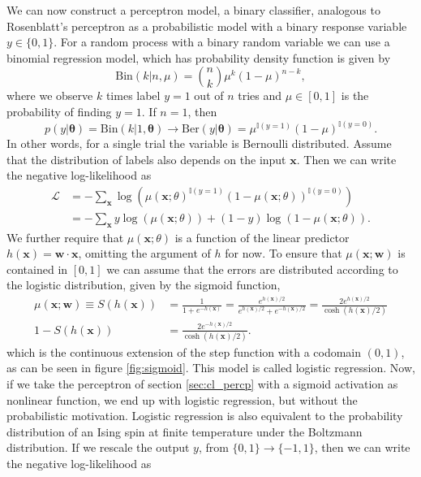 \noindent We can now construct a perceptron model, a binary classifier, analogous to Rosenblatt's perceptron as a probabilistic model with a binary response variable $y\in \{0,1\}$. For a random process with a binary random variable we can use a binomial regression model, which has probability density function is given by
\begin{equation*}
    \text{Bin}(k|n, \mu) = {n \choose k} \mu^k (1-\mu)^{n-k},
\end{equation*}
where we observe $k$ times label $y=1$ out of $n$ tries and $\mu\in[0,1]$ is the probability of finding $y=1$. If $n=1$, then
\begin{equation*}
    p(y|\bm{\theta}) = \text{Bin}(k|1,\bm{\theta})\rightarrow \text{Ber}(y|\bm{\theta})=\mu^{\mathbb{I}(y=1)} (1-\mu)^{\mathbb{I}(y=0)}.
\end{equation*}
In other words, for a single trial the variable is Bernoulli distributed. Assume that the distribution of labels also depends on the input $\mathbf{x}$. Then we can write the negative log-likelihood as
\begin{align*}
    \mathcal{L} &= - \sum_\mathbf{x} \log(\mu(\mathbf{x}; \theta)^{\mathbb{I}(y=1)} (1-\mu(\mathbf{x}; \theta))^{\mathbb{I}(y=0)})\\
    &=- \sum_\mathbf{x} y \log(\mu(\mathbf{x}; \theta)) + (1 - y) \log(1 - \mu(\mathbf{x}; \theta)).
\end{align*}
We further require that $\mu(\mathbf{x}; \theta)$ is a function of the linear predictor  $h(\mathbf{x}) = \mathbf{w} \cdot \mathbf{x}$, omitting the argument of $h$ for now. To ensure that $\mu(\mathbf{x}; \mathbf{w})$ is contained in $[0,1]$ we can assume that the errors are distributed according to the logistic distribution, given by the sigmoid function,
\begin{align}
    \mu(\mathbf{x}; \mathbf{w}) \equiv S(h(\mathbf{x})) &= \frac{1}{1 + e^{-h(\mathbf{x})}} = \frac{e^{h(\mathbf{x})/2}}{e^{h(\mathbf{x})/2} + e^{-h(\mathbf{x})/2}} = \frac{2e^{h(\mathbf{x})/2}}{\cosh(h(\mathbf{x})/2)}\label{eq:log_reg}\\
    1 - S(h(\mathbf{x})) &= \frac{2e^{-h(\mathbf{x})/2}}{\cosh(h(\mathbf{x})/2)}\nonumber.
\end{align}
which is the continuous extension of the step function with a codomain $(0,1)$, as can be seen in figure \ref{fig:sigmoid}. This model is called logistic regression. Now, if we take the perceptron of section \ref{sec:cl_percp} with a sigmoid activation as nonlinear function, we end up with logistic regression, but without the probabilistic motivation. Logistic regression is also equivalent to the probability distribution of an Ising spin at finite temperature under the Boltzmann distribution. If we rescale the output $y$, from $\{0,1\}\rightarrow\{-1,1\}$, then we can write the negative log-likelihood as
